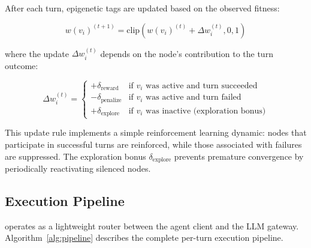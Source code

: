 After each turn, epigenetic tags are updated based on the observed fitness:

\begin{equation}
    w(v_i)^{(t+1)} = \text{clip}\left(w(v_i)^{(t)} + \Delta w_i^{(t)}, 0, 1\right)
\end{equation}

where the update $\Delta w_i^{(t)}$ depends on the node's contribution to the turn outcome:

\begin{equation}
    \Delta w_i^{(t)} = \begin{cases}
        +\delta_{\text{reward}} & \text{if } v_i \text{ was active and turn succeeded} \\
        -\delta_{\text{penalize}} & \text{if } v_i \text{ was active and turn failed} \\
        +\delta_{\text{explore}} & \text{if } v_i \text{ was inactive (exploration bonus)}
    \end{cases}
\end{equation}

This update rule implements a simple reinforcement learning dynamic: nodes that participate in successful turns are reinforced, while those associated with failures are suppressed. The exploration bonus $\delta_{\text{explore}}$ prevents premature convergence by periodically reactivating silenced nodes.

\subsection{Execution Pipeline}
\label{sec:pipeline}

\EpiContext{} operates as a lightweight router between the agent client and the LLM gateway. Algorithm~\ref{alg:pipeline} describes the complete per-turn execution pipeline.


